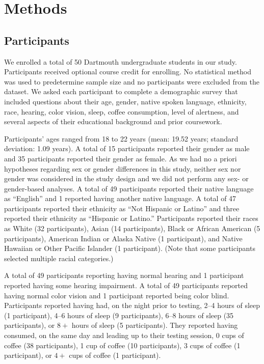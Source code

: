 \documentclass[10pt]{article}
\begin{document}
\section*{Methods}

\subsection*{Participants}

We enrolled a total of 50 Dartmouth undergraduate students in our study.
Participants received optional course credit for enrolling. 
No statistical method was used to predetermine sample size and no 
participants were excluded from the dataset. We asked each
participant to complete a demographic survey that included questions about
their age, gender, native spoken language, ethnicity, race, hearing, color
vision, sleep, coffee consumption, level of alertness, and several aspects of
their educational background and prior coursework.

Participants' ages ranged from 18 to 22 years (mean: 19.52 years; standard
deviation: 1.09 years). A total of 15 participants reported their gender as
male and 35 participants reported their gender as female. As we had no a 
priori hypotheses regarding sex or gender differences in this study,
neither sex nor gender was considered in the study design and we did not
perform any sex- or gender-based analyses. A total of 49
participants reported their native language as ``English'' and 1 reported
having another native language. A total of 47 participants reported their
ethnicity as ``Not Hispanic or Latino'' and three reported their ethnicity as
``Hispanic or Latino.'' Participants reported their races as White (32
participants), Asian (14 participants), Black or African American (5
participants), American Indian or Alaska Native (1 participant), and Native
Hawaiian or Other Pacific Islander (1 participant). (Note that some
participants selected multiple racial categories.)

A total of 49 participants reporting having normal hearing and 1 participant
reported having some hearing impairment. A total of 49 participants reported
having normal color vision and 1 participant reported being color blind.
Participants reported having had, on the night prior to testing, 2--4 hours of
sleep (1 participant), 4--6 hours of sleep (9 participants), 6--8 hours of
sleep (35 participants), or $8+$ hours of sleep (5 participants). They reported
having consumed, on the same day and leading up to their testing session, 0
cups of coffee (38 participants), 1 cup of coffee (10 participants), 3 cups of
coffee (1 participant), or $4+$ cups of coffee (1 participant).
\end{document}

